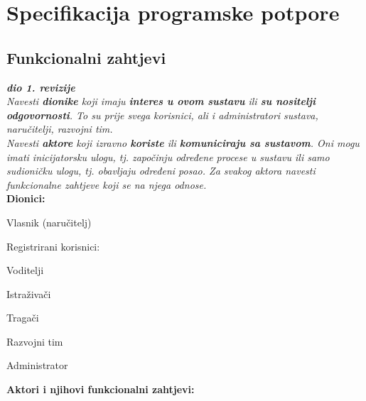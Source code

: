 \chapter{Specifikacija programske potpore}
		
	\section{Funkcionalni zahtjevi}
			
			\textbf{\textit{dio 1. revizije}}\\
			
			\textit{Navesti \textbf{dionike} koji imaju \textbf{interes u ovom sustavu} ili  \textbf{su nositelji odgovornosti}. To su prije svega korisnici, ali i administratori sustava, naručitelji, razvojni tim.}\\
				
			\textit{Navesti \textbf{aktore} koji izravno \textbf{koriste} ili \textbf{komuniciraju sa sustavom}. Oni mogu imati inicijatorsku ulogu, tj. započinju određene procese u sustavu ili samo sudioničku ulogu, tj. obavljaju određeni posao. Za svakog aktora navesti funkcionalne zahtjeve koji se na njega odnose.}\\
			
			
			\noindent \textbf{Dionici:}
			
			\begin{packed_enum}
				
				\item Vlasnik (naručitelj)
				\item Registrirani korisnici:
							
					\begin{packed_enum}
						\item Voditelji
						\item Istraživači
						\item Tragači
					\end{packed_enum}
					
				\item Razvojni tim
				\item Administrator
				
				
			\end{packed_enum}
			
			\noindent \textbf{Aktori i njihovi funkcionalni zahtjevi:}
			
